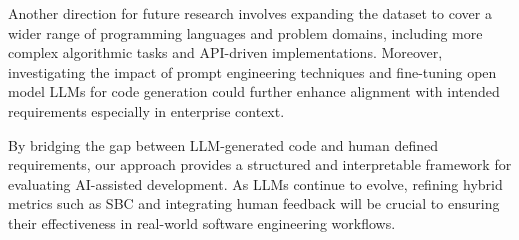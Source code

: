 \documentclass{article}
\begin{document}
Another direction for future research involves expanding the dataset to cover a wider range of programming languages and problem domains, including more complex algorithmic tasks and API-driven implementations. Moreover, investigating the impact of prompt engineering techniques and fine-tuning open model LLMs for code generation could further enhance alignment with intended requirements especially in enterprise context.

By bridging the gap between LLM-generated code and human defined requirements, our approach provides a structured and interpretable framework for evaluating AI-assisted development. As LLMs continue to evolve, refining hybrid metrics such as SBC and integrating human feedback will be crucial to ensuring their effectiveness in real-world software engineering workflows.  


\end{document}
